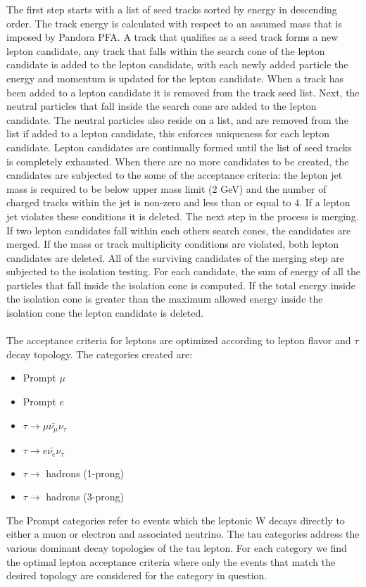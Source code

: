 The first step starts with a list of seed tracks sorted by energy in descending order. The track energy is calculated with respect to an assumed mass that is imposed by Pandora PFA.  A track that qualifies as a seed track forms a new lepton candidate, any track that falls within the search cone of the lepton candidate is added to the lepton candidate, with each newly added particle the energy and momentum is updated for the lepton candidate. When a track has been added to a lepton candidate it is removed from the track seed list. Next, the neutral particles that fall inside the search cone are added to the lepton candidate. The neutral particles also reside on a list, and are removed from the list if added to a lepton candidate, this enforces uniqueness for each lepton candidate. Lepton candidates are continually formed until the list of seed tracks is completely exhausted. When there are no more candidates to be created, the candidates are subjected to the some of the acceptance criteria: the lepton jet mass is required to be below upper mass limit (2 GeV) and the number of charged tracks within the jet is non-zero and less than or equal to 4. If a lepton jet violates these conditions it is deleted. The next step in the process is merging. If two lepton candidates fall within each others search cones, the candidates are merged. If the mass or track multiplicity conditions are violated, both lepton candidates are deleted.  All of the surviving candidates of the merging step are subjected to the isolation testing. For each candidate, the sum of energy of all the particles that fall inside the isolation cone is computed. If the total energy inside the isolation cone is greater than the maximum allowed energy inside the isolation cone the lepton candidate is deleted.\\
\quad \quad \\
The acceptance criteria for leptons are optimized according to lepton flavor and $\tau$ decay topology. The categories created are:
\begin{itemize}
\item Prompt $\mu$
\item Prompt $e$
\item $\tau \rightarrow \mu \bar{\nu_{\mu}} \nu_{\tau} $
\item $\tau \rightarrow e \bar{\nu_{e}} \nu_{\tau} $
\item $\tau \rightarrow$ hadrons (1-prong)
\item $\tau \rightarrow$ hadrons (3-prong)
\end{itemize} 
The Prompt categories refer to events which the leptonic W decays directly to either a muon or electron and associated neutrino. The tau categories address the various dominant decay topologies of the tau lepton. For each category we find the optimal lepton acceptance criteria where only the events that match the desired topology are considered for the category in question.
 
